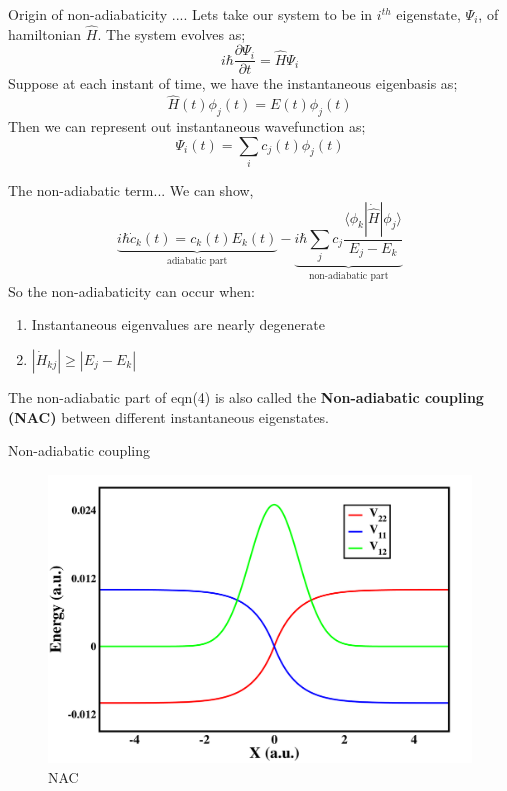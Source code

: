 \documentclass{beamer}
\begin{document}
	\begin{frame}[t]{Origin of non-adiabaticity ....}
	Lets take our system to be in $i^{th}$ eigenstate, $\Psi_i$, of hamiltonian $\hat{H}$. The system evolves as;
	\begin{equation}
	i\hbar\frac{\partial \Psi_i}{\partial t} = \hat{H}\Psi_i
	\end{equation}
	Suppose at each instant of time, we have the instantaneous eigenbasis as;
	\begin{equation}
	\hat{H}(t)\phi_j(t) = E(t)\phi_j(t)
	\end{equation}
	Then we can represent out instantaneous wavefunction as;
	\begin{equation}
	\Psi_i(t) = \sum_i c_j(t)\phi_j(t)
	\end{equation}
    \end{frame}	
    
    \begin{frame}[t]{The non-adiabatic term...}
    We can show,
    \begin{equation}
    \underbrace{i\hbar\dot{c}_k(t) = c_k(t)E_k(t)}_\text{adiabatic part} - \underbrace{i\hbar \sum_jc_j\frac{\langle\phi_k|\dot{\hat{H}}|\phi_j\rangle}{E_j-E_k}}_\text{non-adiabatic part}
    \end{equation}
    So the non-adiabaticity can occur when:
    \begin{enumerate}
    \item{Instantaneous eigenvalues are nearly degenerate}
    \item{$|\dot{H}_{kj}| \geqslant |E_j-E_k|$}
    \end{enumerate}
    The non-adiabatic part of eqn(4) is also called the \textbf{Non-adiabatic coupling (NAC)} between different instantaneous eigenstates.
    \end{frame}  
    
    
	\begin{frame}[t]{Non-adiabatic coupling}
	\begin{figure}
	\includegraphics[scale=0.20]{NAC_elious.png}
	\caption{NAC}
	\end{figure}
	\end{frame}     	
	
\end{document}
